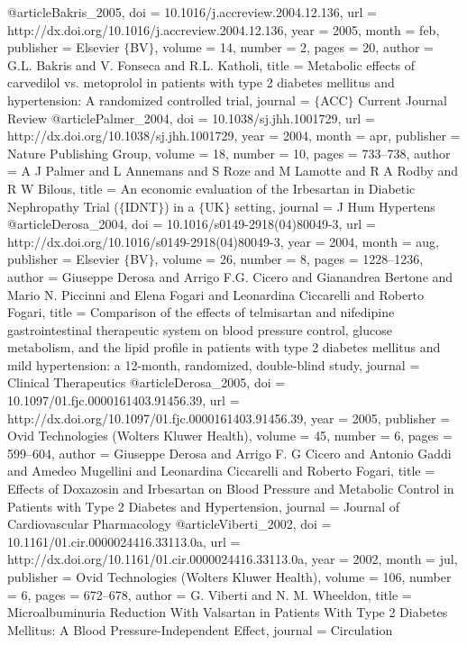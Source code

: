 @article{Bakris_2005,
	doi = {10.1016/j.accreview.2004.12.136},
	url = {http://dx.doi.org/10.1016/j.accreview.2004.12.136},
	year = 2005,
	month = {feb},
	publisher = {Elsevier $\lbrace$BV$\rbrace$},
	volume = {14},
	number = {2},
	pages = {20},
	author = {G.L. Bakris and V. Fonseca and R.L. Katholi},
	title = {Metabolic effects of carvedilol vs. metoprolol in patients with type 2 diabetes mellitus and hypertension: A randomized controlled trial},
	journal = {$\lbrace$ACC$\rbrace$ Current Journal Review}
}
@article{Palmer_2004,
	doi = {10.1038/sj.jhh.1001729},
	url = {http://dx.doi.org/10.1038/sj.jhh.1001729},
	year = 2004,
	month = {apr},
	publisher = {Nature Publishing Group},
	volume = {18},
	number = {10},
	pages = {733--738},
	author = {A J Palmer and L Annemans and S Roze and M Lamotte and R A Rodby and R W Bilous},
	title = {An economic evaluation of the Irbesartan in Diabetic Nephropathy Trial ($\lbrace$IDNT$\rbrace$) in a $\lbrace$UK$\rbrace$ setting},
	journal = {J Hum Hypertens}
}
@article{Derosa_2004,
	doi = {10.1016/s0149-2918(04)80049-3},
	url = {http://dx.doi.org/10.1016/s0149-2918(04)80049-3},
	year = 2004,
	month = {aug},
	publisher = {Elsevier $\lbrace$BV$\rbrace$},
	volume = {26},
	number = {8},
	pages = {1228--1236},
	author = {Giuseppe Derosa and Arrigo F.G. Cicero and Gianandrea Bertone and Mario N. Piccinni and Elena Fogari and Leonardina Ciccarelli and Roberto Fogari},
	title = {Comparison of the effects of telmisartan and nifedipine gastrointestinal therapeutic system on blood pressure control, glucose metabolism, and the lipid profile in patients with type 2 diabetes mellitus and mild hypertension: a 12-month, randomized, double-blind study},
	journal = {Clinical Therapeutics}
}
@article{Derosa_2005,
	doi = {10.1097/01.fjc.0000161403.91456.39},
	url = {http://dx.doi.org/10.1097/01.fjc.0000161403.91456.39},
	year = 2005,
	publisher = {Ovid Technologies (Wolters Kluwer Health)},
	volume = {45},
	number = {6},
	pages = {599--604},
	author = {Giuseppe Derosa and Arrigo F. G Cicero and Antonio Gaddi and Amedeo Mugellini and Leonardina Ciccarelli and Roberto Fogari},
	title = {Effects of Doxazosin and Irbesartan on Blood Pressure and Metabolic Control in Patients with Type 2 Diabetes and Hypertension},
	journal = {Journal of Cardiovascular Pharmacology}
}
@article{Viberti_2002,
	doi = {10.1161/01.cir.0000024416.33113.0a},
	url = {http://dx.doi.org/10.1161/01.cir.0000024416.33113.0a},
	year = 2002,
	month = {jul},
	publisher = {Ovid Technologies (Wolters Kluwer Health)},
	volume = {106},
	number = {6},
	pages = {672--678},
	author = {G. Viberti and N. M. Wheeldon},
	title = {Microalbuminuria Reduction With Valsartan in Patients With Type 2 Diabetes Mellitus: A Blood Pressure-Independent Effect},
	journal = {Circulation}
}
